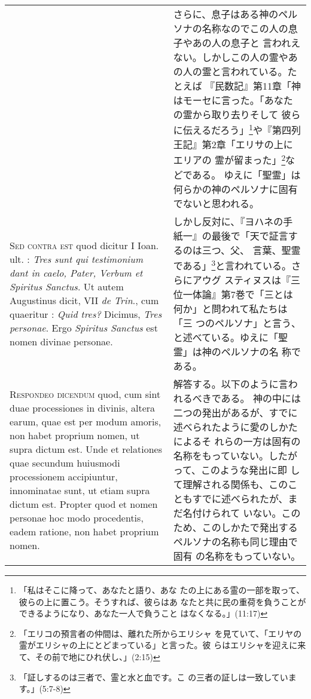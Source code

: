 \documentclass[10pt]{jsarticle} %
\begin{document}
\begin{longtable}{p{21em}p{21em}}
&

さらに、息子はある神のペルソナの名称なのでこの人の息子やあの人の息子と
 言われえない。しかしこの人の霊やあの人の霊と言われている。たとえば
 『民数記』第11章「神はモーセに言った。「あなたの霊から取り去りそして
 彼らに伝えるだろう」\footnote{「私はそこに降って、あなたと語り、あな
 たの上にある霊の一部を取って、彼らの上に置こう。そうすれば、彼らはあ
 なたと共に民の重荷を負うことができるようになり、あなた一人で負うこと
 はなくなる。」(11:17)}や『第四列王記』第2章「エリサの上にエリアの
 霊が留まった」\footnote{「エリコの預言者の仲間は、離れた所からエリシャ
 を見ていて、「エリヤの霊がエリシャの上にとどまっている」と言った。彼
 らはエリシャを迎えに来て、その前で地にひれ伏し、」(2:15) }などである。
 ゆえに「聖霊」は何らかの神のペルソナに固有でないと思われる。

\\



{\scshape Sed contra est} quod dicitur I Ioan. ult. : {\itshape Tres sunt qui testimonium
dant in caelo, Pater, Verbum et Spiritus Sanctus}. Ut autem Augustinus
dicit, VII {\itshape de Trin}., cum quaeritur : {\itshape Quid tres?} Dicimus, {\itshape Tres
personae}. Ergo {\itshape Spiritus Sanctus} est nomen divinae personae.

&

しかし反対に、『ヨハネの手紙一』の最後で「天で証言するのは三つ、父、
 言葉、聖霊である」\footnote{「証しするのは三者で、霊と水と血です。こ
 の三者の証しは一致しています。」(5:7-8)}と言われている。さらにアウグ
 スティヌスは『三位一体論』第7巻で「三とは何か」と問われて私たちは「三
 つのペルソナ」と言う、と述べている。ゆえに「聖霊」は神のペルソナの名
 称である。

\\



{\scshape Respondeo dicendum} quod, cum sint duae processiones in divinis, altera
earum, quae est per modum amoris, non habet proprium nomen, ut supra
dictum est. Unde et relationes quae secundum huiusmodi processionem
accipiuntur, innominatae sunt, ut etiam supra dictum est. 
Propter quod
et nomen personae hoc modo procedentis, eadem ratione, non habet
proprium nomen.


&

解答する。以下のように言われるべきである。
神の中には二つの発出があるが、すでに述べられたように愛のしかたによるそ
 れらの一方は固有の名称をもっていない。したがって、このような発出に即
 して理解される関係も、このこともすでに述べられたが、まだ名付けられて
 いない。このため、このしかたで発出するペルソナの名称も同じ理由で固有
 の名称をもっていない。


\end{longtable}
\end{document}
